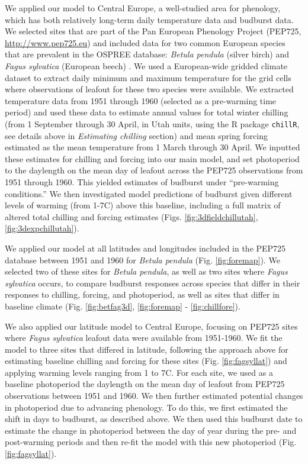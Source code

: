 \documentclass{article}
\begin{document}
\par We applied our model to Central Europe, a well-studied area for phenology, which has both relatively long-term daily temperature data and budburst data. We selected sites that are part of the Pan European Phenology Project (PEP725, \url{http://www.pep725.eu}) and included data for two common European species that are prevalent in the OSPREE database: \emph{Betula pendula} (silver birch) and \emph{Fagus sylvatica} (European beech) \emph{\citep{Templ2018}}. We used a European-wide gridded climate dataset \emph{\citep[{\normalfont E-OBS},][]{cornes2018}} to extract daily minimum and maximum temperature for the grid cells where observations of leafout for these two species were available. We extracted temperature data from 1951 through 1960 (selected as a pre-warming time period) and used these data to estimate annual values for total winter chilling (from 1 September through 30 April, in Utah units, using the R package \texttt{chillR}, see details above in \emph{Estimating chilling} section) and mean spring forcing estimated as the mean temperature from 1 March through 30 April. We inputted these estimates for chilling and forcing into our main model, and set photoperiod to the daylength on the mean day of leafout across the PEP725 observations from 1951 through 1960. This yielded estimates of budburst under ``pre-warming conditions.'' We then investigated model predictions of budburst given different levels of warming (from 1-7\degree C) above this baseline, including a full matrix of altered total chilling and forcing estimates (Figs. \ref{fig:3dfieldchillutah}, \ref{fig:3dexpchillutah}). 
\par We applied our model at all latitudes and longitudes included in the PEP725 database between 1951 and 1960 for \emph{Betula pendula} (Fig. \ref{fig:foremap}). We selected two of these sites for \emph{Betula pendula}, as well as two sites where \emph{Fagus sylvatica} occurs, to compare budburst responses across species that differ in their responses to chilling, forcing, and photoperiod, as well as sites that differ in baseline climate (Fig. \ref{fig:betfag3d}, \ref{fig:foremap} - \ref{fig:chillfore}).

\par We also applied our latitude model to Central Europe, focusing on PEP725 sites where \emph{Fagus sylvatica} leafout data were available from 1951-1960. We fit the model to three sites that differed in latitude, following the approach above for estimating baseline chilling and forcing for these sites (Fig. \ref{fig:fagsyllat}) and applying warming levels ranging from 1 to 7\degree C.   For each site, we used as a baseline photoperiod the daylength on the mean day of leafout from PEP725 observations between 1951 and 1960. We then further estimated potential changes in photoperiod due to advancing phenology. To do this, we first estimated the shift in days to budburst, as described above.
We then used this budburst date to estimate the change in photoperiod between the day of year during the pre- and post-warming periods and then re-fit the model with this new photoperiod (Fig. \ref{fig:fagsyllat}). 
\end{document}

